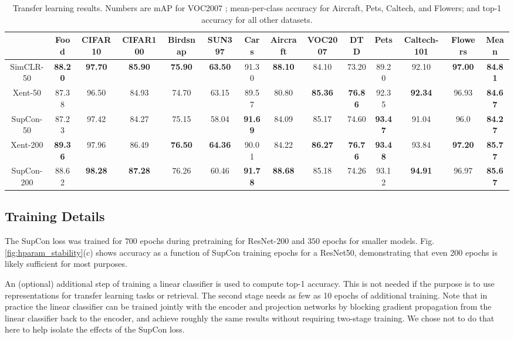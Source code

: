 \begin{table}[t!]
\scriptsize
\setlength{\tabcolsep}{2pt}
\begin{tabular}{cccccccccccccc} 
 \toprule
   & Food & CIFAR10 & CIFAR100  & Birdsnap & SUN397 & Cars & Aircraft & VOC2007 & DTD & Pets & Caltech-101 & Flowers & Mean \\\midrule
 SimCLR-50 \cite{chen2020simple} &  \textbf{88.20} & \textbf{97.70} & \textbf{85.90} & \textbf{75.90} & \textbf{63.50} & 91.30 & \textbf{88.10} & 84.10 & 73.20 & 89.20 & 92.10 & \textbf{97.00} & \textbf{84.81}\\ 
 Xent-50 & 87.38 &	96.50 &	84.93 &	74.70 &	63.15 &	89.57 &	80.80 &	\textbf{85.36} &	\textbf{76.86} &	92.35 &	\textbf{92.34} &	96.93 & \textbf{84.67}\\
  SupCon-50 & 87.23 &	97.42 &	84.27 &	75.15 &	58.04 &	\textbf{91.69} &	84.09 &	85.17 &	74.60 &	\textbf{93.47} &	91.04 &	96.0 & \textbf{84.27}\\
 \midrule
 Xent-200 &  \textbf{89.36} &	97.96 &	86.49 &	\textbf{76.50} &	\textbf{64.36}  & 90.01 & 84.22 & \textbf{86.27} & \textbf{76.76} & \textbf{93.48} & 93.84 & \textbf{97.20} &  \textbf{85.77}\\
  SupCon-200 &  88.62 & \textbf{98.28} & \textbf{87.28} & 76.26 & 60.46 & \textbf{91.78} & \textbf{88.68} & 85.18 & 74.26 & 93.12 & \textbf{94.91} & 96.97 & \textbf{85.67}\\
  \bottomrule
\end{tabular}


\vspace{2mm}
\caption{Transfer learning results.  Numbers are mAP for VOC2007 \cite{pascal-voc-2007}; mean-per-class accuracy for Aircraft, Pets, Caltech, and Flowers; and top-1 accuracy for all other datasets.} %
\vspace{-22pt}
\label{table:transfer}
\end{table}


\subsection{Training Details}
The SupCon loss was trained for $700$ epochs during pretraining for ResNet-200 and $350$ epochs for smaller models. Fig. \ref{fig:hparam_stability}(c) shows accuracy as a function of SupCon training epochs for a ResNet50, demonstrating that even 200 epochs is likely sufficient for most purposes.

An (optional) additional step of training a linear classifier is used to compute top-1 accuracy. This is not needed if the purpose is to use representations for transfer learning tasks or retrieval. The second stage needs as few as 10 epochs of additional training. Note that in practice the linear classifier can be trained jointly with the encoder and projection networks by blocking gradient propagation from the linear classifier back to the encoder, and achieve roughly the same results without requiring two-stage training. We chose not to do that here to help isolate the effects of the SupCon loss.

